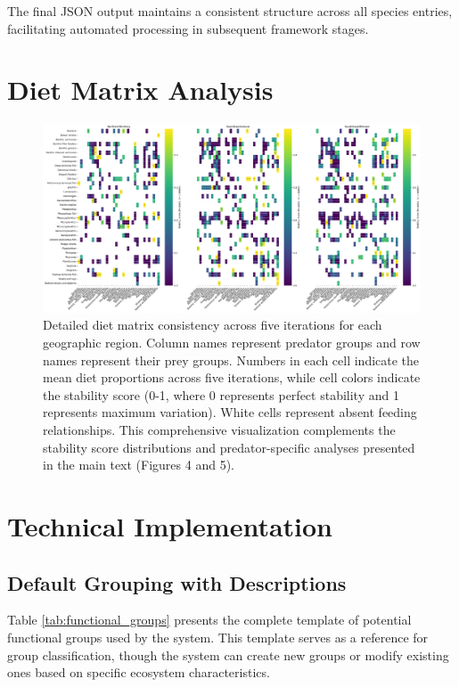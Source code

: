 The final JSON output maintains a consistent structure across all species entries, facilitating automated processing in subsequent framework stages.

\section{Diet Matrix Analysis}\label{supp:diet_matrix}


\begin{landscape}
  \begin{figure}[p]
      \centering
      \includegraphics[width=\linewidth]{figures/diet_interaction_heatmap.png}
      \caption{Detailed diet matrix consistency across five iterations for each geographic region. Column names represent predator groups and row names represent their prey groups. Numbers in each cell indicate the mean diet proportions across five iterations, while cell colors indicate the stability score (0-1, where 0 represents perfect stability and 1 represents maximum variation). White cells represent absent feeding relationships. This comprehensive visualization complements the stability score distributions and predator-specific analyses presented in the main text (Figures 4 and 5).}
      \label{fig:diet_matrix_supp}
  \end{figure}
  \end{landscape}
  
  \section{Technical Implementation}\label{supp:technical_implementation}
  \subsection{Default Grouping with Descriptions}
  
  Table \ref{tab:functional_groups} presents the complete template of potential functional groups used by the system. This template serves as a reference for group classification, though the system can create new groups or modify existing ones based on specific ecosystem characteristics.
  
